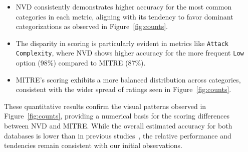 \documentclass[12pt]{article}
\begin{document}
\begin{itemize}
	\item NVD consistently demonstrates higher accuracy for the most common categories in each metric,
	      aligning with its tendency to favor dominant categorizations as observed in Figure~\ref{fig:counts}.

	\item The disparity in scoring is particularly evident in metrics like \texttt{Attack Complexity}, where
	      NVD shows higher accuracy for the more frequent \texttt{Low} option (98\%) compared to
	      MITRE (87\%).

	\item MITRE's scoring exhibits a more balanced distribution across categories, consistent with the wider
	      spread of ratings seen in Figure~\ref{fig:counts}.
\end{itemize}

These quantitative results confirm the visual patterns observed in Figure~\ref{fig:counts},
providing a numerical basis for the scoring differences between NVD and MITRE. While the overall
estimated accuracy for both databases is lower than in previous studies~\cite{bayes}, the relative
performance and tendencies remain consistent with our initial observations.

\bigskip
\end{document}
